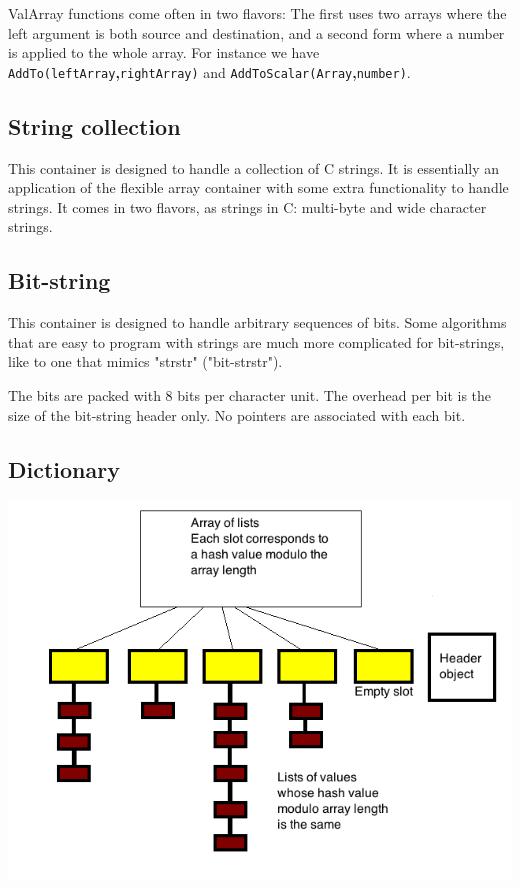 \documentclass[12pt,a4paper]{memoir} %
\begin{document}
ValArray functions come often in two flavors: The first uses two arrays where the left argument is both source and destination, and a second form where
a number is applied to the whole array. For instance we have \verb,AddTo(leftArray,\textbf{,}\verb,rightArray), and \verb,AddToScalar(Array,\textbf{,}\verb,number),.
\subsection{String collection}
This container is designed to handle a collection of C strings. It is essentially an application of the flexible array container with some extra functionality to handle strings. It comes in two flavors, as strings in C: multi-byte and wide character strings.
\subsection{Bit-string}
This container is designed to handle arbitrary sequences of bits. Some algorithms that are easy to program with strings are much more complicated for bit-strings, like to one that mimics "strstr" ("bit-strstr"). 

The bits are packed with 8 bits per character unit. The overhead per bit is the size of the bit-string header only. No pointers are associated with each bit.

\subsection{Dictionary}

\includegraphics[scale=0.63]{HashTable.png}
\end{document}

